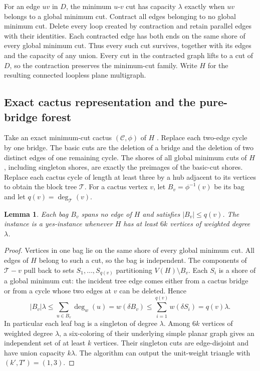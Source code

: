 \documentclass[10pt,letterpaper]{article}
\newtheorem{lemma}{Lemma}
\newcommand{\tree}{\mathcal T}
\newcommand{\cactus}{\mathcal C}
\begin{document}
For an edge \(uv\) in \(D\), the minimum \(u\)-\(v\) cut has capacity \(\lambda\) exactly when \(uv\) belongs to a global minimum cut. Contract all edges belonging to no global minimum cut. Delete every loop created by contraction and retain parallel edges with their identities. Each contracted edge has both ends on the same shore of every global minimum cut. Thus every such cut survives, together with its edges and the capacity of any union. Every cut in the contracted graph lifts to a cut of \(D\), so the contraction preserves the minimum-cut family. Write \(H\) for the resulting connected loopless plane multigraph.

\subsection{Exact cactus representation and the pure-bridge forest}
Take an exact minimum-cut cactus \((\cactus,\phi)\) of \(H\) \cite{FleinerFrank,HeHuangSaranurak}. Replace each two-edge cycle by one bridge. The basic cuts are the deletion of a bridge and the deletion of two distinct edges of one remaining cycle. The shores of all global minimum cuts of \(H\), including singleton shores, are exactly the preimages of the basic-cut shores. Replace each cactus cycle of length at least three by a hub adjacent to its vertices to obtain the block tree \(\tree\). For a cactus vertex \(v\), let \(B_v=\phi^{-1}(v)\) be its bag and let \(q(v)=\deg_{\tree}(v)\).

\begin{lemma}\label{lem:bag}
Each bag \(B_v\) spans no edge of \(H\) and satisfies \(|B_v|\le q(v)\). The instance is a yes-instance whenever \(H\) has at least \(6k\) vertices of weighted degree \(\lambda\).
\end{lemma}
\begin{proof}
Vertices in one bag lie on the same shore of every global minimum cut. All edges of \(H\) belong to such a cut, so the bag is independent. The components of \(\tree-v\) pull back to sets \(S_1,\ldots,S_{q(v)}\) partitioning \(V(H)\setminus B_v\). Each \(S_i\) is a shore of a global minimum cut: the incident tree edge comes either from a cactus bridge or from a cycle whose two edges at \(v\) can be deleted. Hence
\[
 |B_v|\lambda
 \le\sum_{u\in B_v}\deg_w(u)
 =w(\delta B_v)
 \le\sum_{i=1}^{q(v)}w(\delta S_i)=q(v)\lambda .
\]
In particular each leaf bag is a singleton of degree \(\lambda\). Among \(6k\) vertices of weighted degree \(\lambda\), a six-coloring of their underlying simple planar graph gives an independent set of at least \(k\) vertices. Their singleton cuts are edge-disjoint and have union capacity \(k\lambda\). The algorithm can output the unit-weight triangle with \((k',T')=(1,3)\).
\end{proof}
\end{document}
